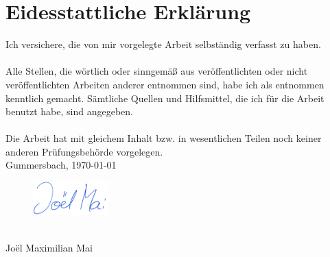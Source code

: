 \chapter*{Eidesstattliche Erklärung}

Ich versichere, die von mir vorgelegte Arbeit selbständig verfasst zu haben.\\ \\
Alle Stellen, die wörtlich oder sinngemäß aus veröffentlichten oder nicht veröffentlichten Arbeiten anderer entnommen sind, habe ich als entnommen kenntlich gemacht. Sämtliche Quellen und Hilfsmittel, die ich für die Arbeit benutzt habe, sind angegeben.\\ \\
Die Arbeit hat mit gleichem Inhalt bzw. in wesentlichen Teilen noch keiner anderen Prüfungsbehörde vorgelegen.
\vspace{1.5cm}
\\
Gummersbach, \today
\vspace{1cm}
\\
\begin{figure}[!ht]
		\includegraphics[width=0.26\textwidth]{images/assets/mySignature.jpg}
\end{figure}
\\
Joël Maximilian Mai
